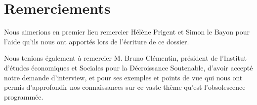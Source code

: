 \chapter*{Remerciements}


Nous aimerions en premier lieu remercier Hélène Prigent et Simon le Bayon pour l'aide qu'ils nous ont apportés lors de l'écriture de ce dossier.

\bigbreak Nous tenions également à remercier M. Bruno Clémentin, président de l'Institut d'études économiques et Sociales pour la Décroissance Soutenable, d'avoir accepté notre demande d'interview, et pour ses exemples et points de vue qui nous ont permis d'approfondir nos connaissances sur ce vaste thème qu'est l'obsolescence programmée.


